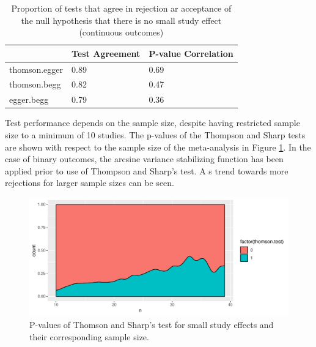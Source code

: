 \documentclass[11pt,a4paper,twoside]{book}\usepackage[]{graphicx}\usepackage[]{color}
\newenvironment{knitrout}{}{} %
\begin{document}
\begin{table}[ht]
\centering
\begingroup\footnotesize
\begin{tabular}{lll}
  \hline
 & Test Agreement & P-value Correlation \\ 
  \hline
thomson.egger & 0.89 & 0.69 \\ 
  thomson.begg & 0.82 & 0.47 \\ 
  egger.begg & 0.79 & 0.36 \\ 
   \hline
\end{tabular}
\endgroup
\caption{Proportion of tests that agree in rejection ar acceptance of the null hypothesis that there is no small study effect (continuous outcomes)} 
\label{agreement.cont}
\end{table}


\vspace{0mm}
Test performance depends on the sample size, despite having restricted sample size to a minimum of 10 studies. The p-values of the Thompson and Sharp tests are shown with respect to the sample size of the meta-analysis in Figure \ref{pvalues.samplesize}. %
In the case of binary outcomes, the arcsine variance stabilizing function has been applied prior to use of Thompson and Sharp's test. A s trend towards more rejections for larger sample sizes can be seen.

\begin{figure}
\begin{knitrout}
\color{fgcolor}

{\centering \includegraphics[width=\textwidth-3cm]{figure/ch02_figunnamed-chunk-33-1} 

}



\end{knitrout}
\caption{P-values of Thomson and Sharp's test for small study effects and their corresponding sample size.}
\label{pvalues.samplesize}
\end{figure}
\end{document}
